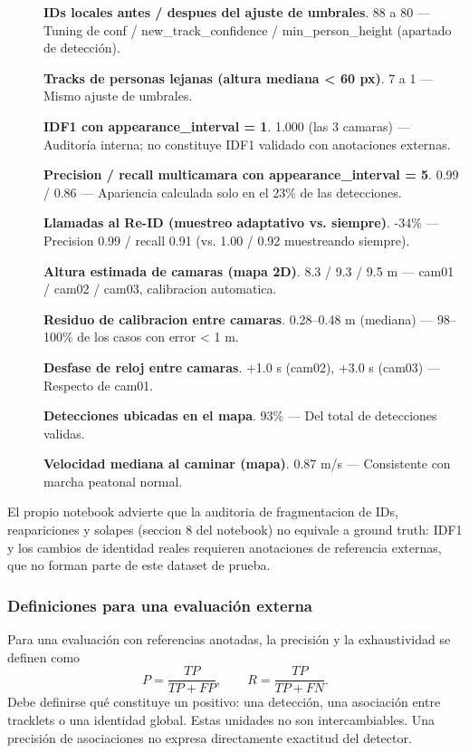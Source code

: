 \documentclass[12pt,letterpaper]{article}
\begin{document}
\begin{description}

\item[] \textbf{IDs locales antes / despues del ajuste de umbrales}. 88  a  80 — Tuning de conf / new\_track\_confidence / min\_person\_height (apartado de detección).

\item[] \textbf{Tracks de personas lejanas (altura mediana < 60 px)}. 7  a  1 — Mismo ajuste de umbrales.

\item[] \textbf{IDF1 con appearance\_interval = 1}. 1.000 (las 3 camaras) — Auditoría interna; no constituye IDF1 validado con anotaciones externas.

\item[] \textbf{Precision / recall multicamara con appearance\_interval = 5}. 0.99 / 0.86 — Apariencia calculada solo en el 23\% de las detecciones.

\item[] \textbf{Llamadas al Re-ID (muestreo adaptativo vs. siempre)}. -34\% — Precision 0.99 / recall 0.91 (vs. 1.00 / 0.92 muestreando siempre).

\item[] \textbf{Altura estimada de camaras (mapa 2D)}. 8.3 / 9.3 / 9.5 m — cam01 / cam02 / cam03, calibracion automatica.

\item[] \textbf{Residuo de calibracion entre camaras}. 0.28–0.48 m (mediana) — 98–100\% de los casos con error < 1 m.

\item[] \textbf{Desfase de reloj entre camaras}. +1.0 s (cam02), +3.0 s (cam03) — Respecto de cam01.

\item[] \textbf{Detecciones ubicadas en el mapa}. 93\% — Del total de detecciones validas.

\item[] \textbf{Velocidad mediana al caminar (mapa)}. 0.87 m/s — Consistente con marcha peatonal normal.

\end{description}


El propio notebook advierte que la auditoria de fragmentacion de IDs, reapariciones y solapes (seccion 8 del notebook) no equivale a ground truth: IDF1 y los cambios de identidad reales requieren anotaciones de referencia externas, que no forman parte de este dataset de prueba.


\subsubsection{Definiciones para una evaluación externa}
Para una evaluación con referencias anotadas, la precisión y la exhaustividad se definen como
\[
 P=\frac{TP}{TP+FP},\qquad R=\frac{TP}{TP+FN}.
\]
Debe definirse qué constituye un positivo: una detección, una asociación entre tracklets o una identidad global. Estas unidades no son intercambiables. Una precisión de asociaciones no expresa directamente exactitud del detector.
\end{document}

